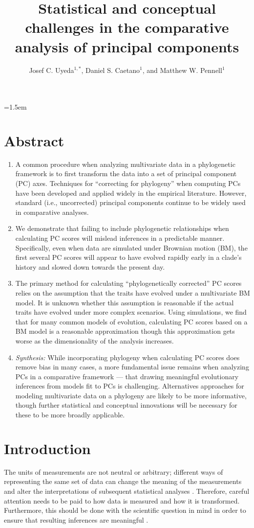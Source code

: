 \documentclass[a4paper,12pt]{article}
\title{Statistical and conceptual challenges in the comparative analysis of principal components}
\author{
Josef C. Uyeda$^{1,*}$, Daniel S. Caetano$^1$, and Matthew W. Pennell$^1$
}
\date{}
\affiliation{
 $^{1}$ Department of Biological Sciences \& Institute for Bioinformatics and Evolutionary Studies, University of Idaho, Moscow, ID 83844, U.S.A.\\ 
 $^{*}$ Email for correspondence: \texttt{pseudacris@gmail.com}\\
}
\begin{document}
\mstitlepage
\parindent=1.5em
\addtolength{\parskip}{.3em}
\vfill

\section{Abstract}
\begin{enumerate}
\item A common procedure when analyzing multivariate data in a phylogenetic framework is to first transform the data into a set of principal component (PC) axes. Techniques for ``correcting for phylogeny'' when computing PCs have been developed and applied widely in the empirical literature. However, standard (i.e., uncorrected) principal components continue to be widely used in comparative analyses.

\item We demonstrate that failing to include phylogenetic relationships when calculating PC scores will mislead inferences in a predictable manner. Specifically, even when data are simulated under Brownian motion (BM), the first several PC scores will appear to have evolved rapidly early in a clade's history and slowed down towards the present day.

\item The primary method for calculating ``phylogenetically corrected'' PC scores relies on the assumption that the traits have evolved under a multivariate BM model. It is unknown whether this assumption is reasonable if the actual traits have evolved under more complex scenarios. Using simulations, we find that for many common models of evolution, calculating PC scores based on a BM model is a reasonable approximation though this approximation gets worse as the dimensionality of the analysis increases.

\item \emph{Synthesis:} While incorporating phylogeny when calculating PC scores does remove bias in many cases, a more fundamental issue remains when analyzing PCs in a comparative framework --- that drawing meaningful evolutionary inferences from models fit to PCs is challenging. Alternatives approaches for modeling multivariate data on a phylogeny are likely to be more informative, though further statistical and conceptual innovations will be necessary for these to be more broadly applicable.
\end{enumerate} 

\newpage

\section{Introduction}
The units of measurements are not neutral or arbitrary; different ways of representing the same set of data can change the meaning of the measurements and alter the interpretations of subsequent statistical analyses \citep{Hand2004, HansenHoule2008, Houle2011}. Therefore, careful attention needs to be paid to how data is measured and how it is transformed. Furthermore, this should be done with the scientific question in mind in order to ensure that resulting inferences are meaningful \citep{Houle2011}. 
\end{document}
